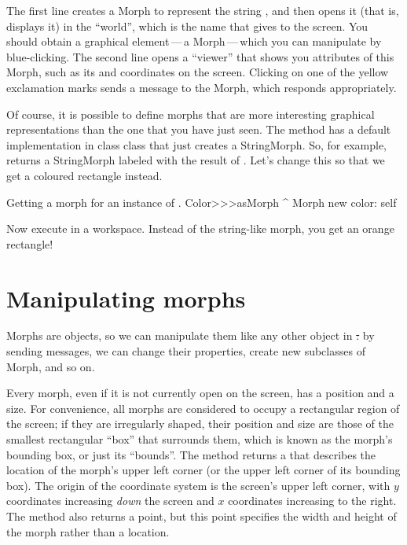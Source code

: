 \documentclass[a4paper,10pt,twoside]{book}
\begin{document}
The first line creates a Morph to represent the string , and then opens it (that is, displays it) in the ``world'', which is the name that \sq gives to the screen.  
You should obtain a graphical element\,---\,a Morph\,---\,which you can manipulate by blue-clicking.
The second line opens a ``viewer'' that shows you attributes of this Morph, such as its  and   coordinates on the screen.  Clicking on one of the yellow exclamation marks sends a message to the Morph, which responds appropriately.

Of course, it is possible to define morphs that are more interesting graphical representations than the one that you have just seen.
The method  has a default implementation in class  class that just creates a StringMorph.
So, for example,  returns a StringMorph labeled with the result of  .
Let's change this so that we get a coloured rectangle instead.

\begin{method}{Getting a morph for an instance of .}
Color>>>asMorph
	^ Morph new color: self
\end{method}
\noindent
Now execute   in a workspace. Instead of the string-like morph, you get an orange rectangle!


\section{Manipulating morphs}

Morphs are objects, so we can manipulate them like any other object in \st: by sending messages, we can change their properties, create new subclasses of Morph, and so on.

Every morph, even if it is not currently open on the screen, has a position and a size.  
For convenience, all morphs are considered to occupy a rectangular region of the screen; if they are irregularly shaped, their position and size are those of the smallest rectangular ``box'' that surrounds them, which is known as the morph's bounding box, or just its ``bounds''.
The  method returns a  that describes the location of the morph's upper left corner (or the upper left corner of its bounding box). 
The origin of the coordinate system is the screen's upper left corner, with $y$ coordinates increasing \emph{down} the screen and $x$ coordinates increasing to the right.
The  method also returns a point, but this point specifies the width and height of the morph rather than a location.
\end{document}

